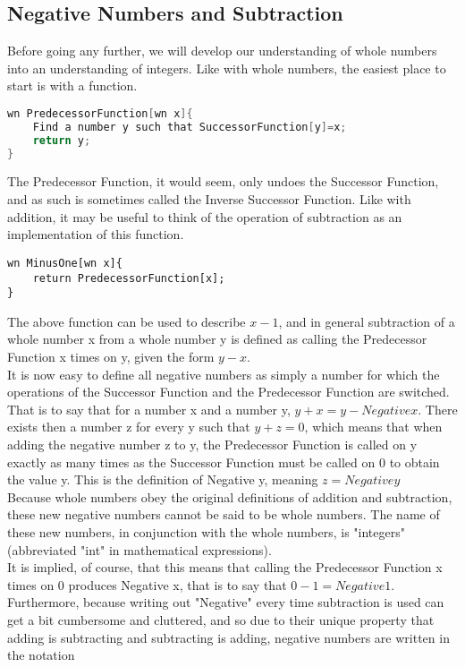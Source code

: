 \subsection{Negative Numbers and Subtraction}
Before going any further, we will develop our understanding of whole numbers into an understanding of integers. Like with whole numbers, the easiest place to start is with a function.
\begin{center}
\begin{lstlisting}[language=C,caption=The Predecessor Function,label=lst:predFunc]
wn PredecessorFunction[wn x]{
	Find a number y such that SuccessorFunction[y]=x;
	return y;
}
\end{lstlisting}
\end{center}
The Predecessor Function, it would seem, only undoes the Successor Function, and as such is sometimes called the Inverse Successor Function. Like with addition, it may be useful to think of the operation of subtraction as an implementation of this function.
\begin{center}
\begin{lstlisting}
wn MinusOne[wn x]{
	return PredecessorFunction[x];
}
\end{lstlisting}
\end{center}
The above function can be used to describe $x-1$, and in general subtraction of a whole number x from a whole number y is defined as calling the Predecessor Function x times on y, given the form $y-x$. \\
It is now easy to define all negative numbers as simply a number for which the operations of the Successor Function and the Predecessor Function are switched. That is to say that for a number x and a number y, $y+x=y- Negative x$. There exists then a number z for every y such that $y+z=0$, which means that when adding the negative number z to y, the Predecessor Function is called on y exactly as many times as the Successor Function must be called on $0$ to obtain the value y. This is the definition of Negative y, meaning $z=Negative y$ \\
Because whole numbers obey the original definitions of addition and subtraction, these new negative numbers cannot be said to be whole numbers. The name of these new numbers, in conjunction with the whole numbers, is "integers" (abbreviated "int" in mathematical expressions). \\
It is implied, of course, that this means that calling the Predecessor Function x times on $0$ produces Negative x, that is to say that $0-1=Negative 1$. Furthermore, because writing out "Negative" every time subtraction is used can get a bit cumbersome and cluttered, and so due to their unique property that adding is subtracting and subtracting is adding, negative numbers are written in the notation

